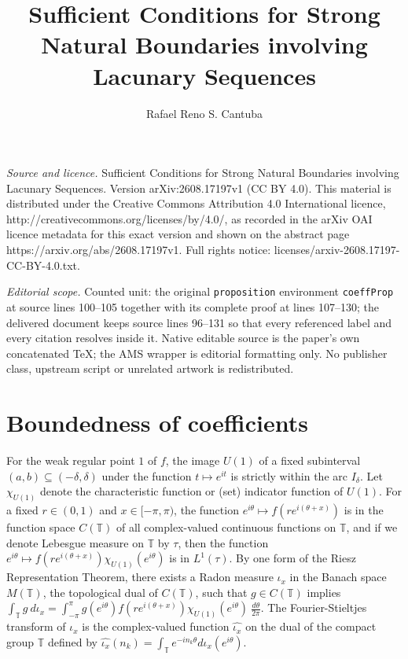 \documentclass[10pt,a4paper]{amsart}
\newcommand{\T}{\mathbb{T}}
\def\LebT{\tau}
\begin{document}
\title[Sufficient Conditions for Strong Natural Boundaries involvin]{Sufficient Conditions for Strong Natural Boundaries involving Lacunary Sequences}
\author{Rafael Reno S. Cantuba}
\date{}
\maketitle
\noindent\emph{Source and licence.} Sufficient Conditions for Strong Natural Boundaries involving Lacunary Sequences. Version arXiv:2608.17197v1 (CC BY 4.0). This material is distributed under the Creative Commons Attribution 4.0 International licence, http://creativecommons.org/licenses/by/4.0/, as recorded in the arXiv OAI licence metadata for this exact version and shown on the abstract page https://arxiv.org/abs/2608.17197v1. Full rights notice: licenses/arxiv-2608.17197-CC-BY-4.0.txt.\par\smallskip
\noindent\textit{Editorial scope.} Counted unit: the original \texttt{proposition} environment \texttt{coeffProp} at source lines 100--105 together with its complete proof at lines 107--130; the delivered document keeps source lines 96--131 so that every referenced label and every citation resolves inside it. Native editable source is the paper's own concatenated TeX; the AMS wrapper is editorial formatting only. No publisher class, upstream script or unrelated artwork is redistributed.
\section{Boundedness of coefficients}\label{CoeffSec}

For the weak regular point $1$ of $f$, the image $U(1)$ of a fixed subinterval $(a,b) \subseteq (-\delta,\delta) $ under the function $t \mapsto e^{it}$ is strictly within the arc $I_\delta$. Let $\chi_{U(1)}$ denote the characteristic function or (set) indicator function of $U(1)$. For a fixed $r \in (0,1)$ and $x \in [-\pi, \pi)$, the function $e^{i\theta} \mapsto f(re^{i(\theta+x)})$ is in the function space $C(\T)$ of all complex-valued continuous functions on $\T$, and if we denote Lebesgue measure on $\T$ by $\LebT$, then the function $e^{i\theta}\mapsto f(re^{i(\theta+x)})\chi_{U(1)}(e^{i\theta})$ is in $L^{1}(\LebT)$. By one form of the Riesz Representation Theorem, there exists a Radon measure $\iota_x$ in the Banach space $M(\T)$, the topological dual of $C(\T)$, such that $g\in C(\T)$ implies $\int_\T g\  d\iota_x= \int_{-\pi}^\pi g(e^{i\theta})f(re^{i(\theta+x)})\chi_{U(1)}(e^{i\theta})\  \frac{d\theta}{2\pi}$. The Fourier-Stieltjes transform of $\iota_x$ is the complex-valued function $\widehat{\iota_x}$ on the dual of the compact group $\T$ defined by $\widehat{\iota_x}(n_k) = \int_{\T} e^{-in_k\theta} d\iota_x(e^{i\theta})$.
\end{document}
